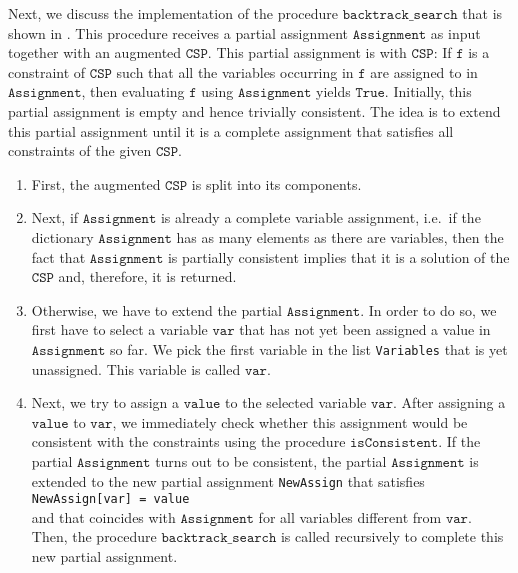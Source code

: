 Next, we discuss the implementation of the procedure $\texttt{backtrack\_search}$ that is shown in
.  This procedure receives a partial assignment 
$\texttt{Assignment}$ as input together with an augmented $\texttt{CSP}$.  This partial assignment is
 with $\texttt{CSP}$:  If $\texttt{f}$ is a constraint of $\texttt{CSP}$ such that
all the variables occurring in $\texttt{f}$ are assigned to in $\texttt{Assignment}$, then evaluating
$\texttt{f}$ using $\texttt{Assignment}$ yields $\texttt{True}$.  Initially, this partial assignment is empty
and hence trivially consistent.  The idea is to extend this partial assignment until it is a complete
assignment that satisfies all constraints of the given $\texttt{CSP}$.
\begin{enumerate}
\item First, the augmented $\texttt{CSP}$ is split into its components.
\item Next, if $\texttt{Assignment}$ is already a complete variable assignment, i.e.~if the dictionary
      $\texttt{Assignment}$ has as many elements as there are variables, then the fact that
      $\texttt{Assignment}$ is partially consistent implies that
      it is a solution of the $\texttt{CSP}$ and, therefore, it is returned.
\item Otherwise, we have to extend the partial $\texttt{Assignment}$.  In order to do so, we first have to
      select a variable $\texttt{var}$ that has not yet been assigned a value in $\texttt{Assignment}$ so far.
      We pick the first variable in the list \texttt{Variables} that is yet unassigned.
      This variable is called $\texttt{var}$.
\item Next, we try to assign a $\texttt{value}$ to the selected variable $\texttt{var}$.  After assigning
      a $\texttt{value}$ to $\texttt{var}$, we immediately check whether this assignment would be consistent
      with the constraints using the procedure $\texttt{isConsistent}$.
      If the partial $\texttt{Assignment}$ turns out to be consistent, the partial $\texttt{Assignment}$
      is extended to the new partial assignment \texttt{NewAssign} that satisfies
      \\[0.2cm]
      \hspace*{1.3cm}
      \texttt{NewAssign[var] = value}
      \\[0.2cm]
      and that coincides with $\texttt{Assignment}$ for all variables different from $\texttt{var}$.
      Then, the procedure $\texttt{backtrack\_search}$ is called recursively to complete this new partial assignment.

\end{enumerate}
